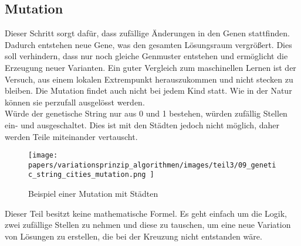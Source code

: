%
%
%
%
\subsection{Mutation
\label{genetic_algorithm:mutation}}
Dieser Schritt sorgt dafür, dass zufällige Änderungen in 
den Genen stattfinden. Dadurch entstehen neue Gene, was den 
gesamten Lösungsraum vergrößert. Dies soll verhindern, 
dass nur noch gleiche Genmuster entstehen und ermöglicht 
die Erzeugung neuer Varianten. Ein guter Vergleich zum 
maschinellen Lernen ist der Versuch, aus einem lokalen 
Extrempunkt herauszukommen und nicht stecken zu bleiben.
Die Mutation findet auch nicht bei jedem Kind statt. Wie 
in der Natur können sie perzufall ausgelösst werden.
\\
Würde der genetische String nur aus 0 und 1 bestehen, 
würden zufällig Stellen ein- und ausgeschaltet. Dies 
ist mit den Städten jedoch nicht möglich, daher werden 
Teile miteinander vertauscht.

\begin{figure}
	\centering
	\texttt{[image: 
        papers/variationsprinzip\_algorithmen/images/teil3/09\_genetic\_string\_cities\_mutation.png
        ]}
	\caption{Beispiel einer Mutation mit Städten}
	\label{fig:mutation_genetic_string}
\end{figure}

Dieser Teil besitzt keine mathematische Formel. Es geht einfach 
um die Logik, zwei zufällige Stellen zu nehmen und diese zu 
tauschen, um eine neue Variation von Lösungen zu erstellen, die 
bei der Kreuzung nicht entstanden wäre.
